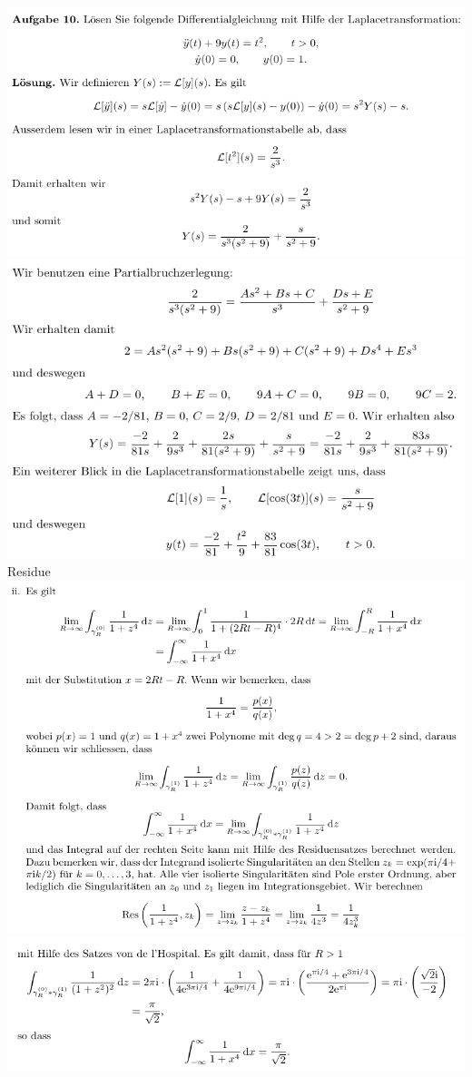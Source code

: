 \includegraphics[width=1\textwidth]{images/img_koma/lapl1.png}
\includegraphics[width=1\textwidth]{images/img_koma/lapl2.png}
Residue\\
\includegraphics[width=1\textwidth]{images/img_koma/residue1.png}
\includegraphics[width=1\textwidth]{images/img_koma/residue2.png}
